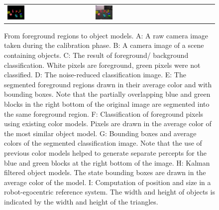 \begin{figure}[t]
\begin{tabular}{@{}l@{}p{}@{}l@{}p{}@{}l@{}p{}@{}l@{}p{}@{}l@{}}
      \includegraphics[width=0.23\textwidth]{figures/vision-system-object-perception-7} & &
      \includegraphics[width=0.23\textwidth]{figures/vision-system-object-perception-8} \\
    \end{tabular}
  \caption{From foreground regions to object models. A: A raw camera
    image taken during the calibration phase. B: A camera image of a
    scene containing objects. C: The result of foreground/ background
    classification. White pixels are foreground, green pixels were not
    classified. D: The noise-reduced classification image. E: The
    segmented foreground regions drawn in their average color and with
    bounding boxes. Note that the partially overlapping blue and green
    blocks in the right bottom of the original image are segmented
    into the same foreground region. F: Classification of foreground
    pixels using existing color models. Pixels are drawn in the
    average color of the most similar object model. G: Bounding boxes
    and average colors of the segmented classification image. Note
    that the use of previous color models helped to generate separate
    percepts for the blue and green blocks at the right bottom of the
    image. H: Kalman filtered object models. The state bounding boxes
    are drawn in the average color of the model. I: Computation of
    position and size in a robot-egocentric reference system. The
    width and height of objects is indicated by the width and height
    of the triangles.}
  \label{f:object-perception}
\end{figure}

